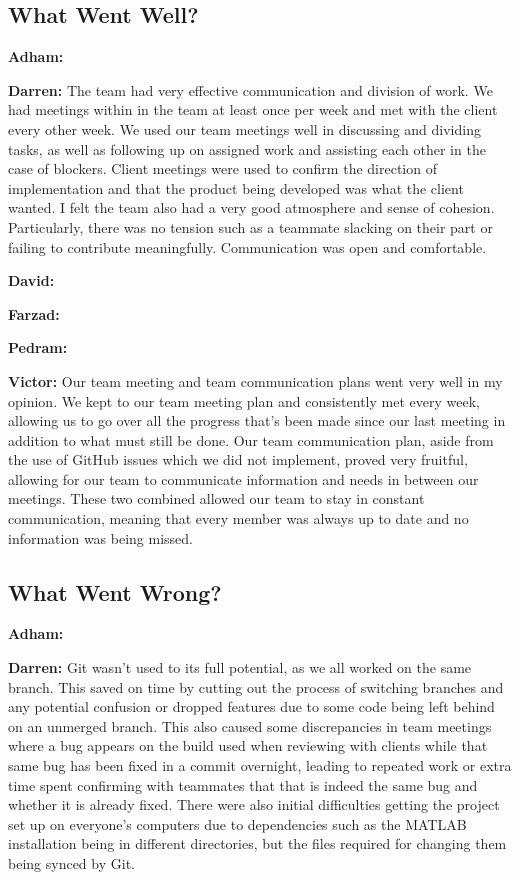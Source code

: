 \documentclass{article}
\begin{document}
\subsection{What Went Well?}

\textbf{Adham:}

\textbf{Darren:} The team had very effective communication and division of work. We had meetings  within in the team at least once per week and met with the client every other week. We used our team meetings well in discussing and dividing tasks, as well as following up on assigned work and assisting each other in the case of blockers. Client meetings were used to confirm the direction of implementation and that the product being developed was what the client wanted. I felt the team also had a very good atmosphere and sense of cohesion. Particularly, there was no tension such as a teammate slacking on their part or failing to contribute meaningfully. Communication was open and comfortable.

\textbf{David:}

\textbf{Farzad:}

\textbf{Pedram:}

\textbf{Victor:} Our team meeting and team communication plans went very well in my opinion. We kept to our team meeting plan and consistently met every week, allowing us to go over all the progress that's been made since our last meeting in addition to what must still be done. Our team communication plan, aside from the use of GitHub issues which we did not implement, proved very fruitful, allowing for our team to communicate information and needs in between our meetings. These two combined allowed our team to stay in constant communication, meaning that every member was always up to date and no information was being missed.

\subsection{What Went Wrong?}

\textbf{Adham:}

\textbf{Darren:} Git wasn't used to its full potential, as we all worked on the same branch. This saved on time by cutting out the process of switching branches and any potential confusion or dropped features due to some code being left behind on an unmerged branch. This also caused some discrepancies in team meetings where a bug appears on the build used when reviewing with clients while that same bug has been fixed in a commit overnight, leading to repeated work or extra time spent confirming with teammates that that is indeed the same bug and whether it is already fixed. There were also initial difficulties getting the project set up on everyone's computers due to dependencies such as the MATLAB installation being in different directories, but the files required for changing them being synced by Git.
\end{document}
